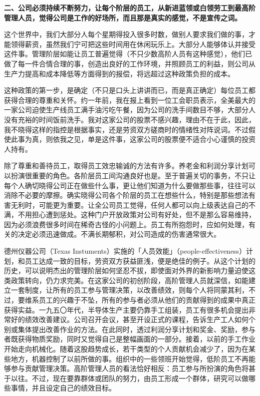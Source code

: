 \documentclass[UTF8,a4paper,zihao=-4,fontset = windows]{ctexart} %
\begin{document}
\textbf{二、公司必须持续不断努力，让每个阶层的员工，从新进蓝领或白领劳工到最高阶管理人员，觉得公司是工作的好场所，而且那是真实的感觉，不是宣传之词。}


这个世界中，我们大部分人每个星期得投入很多时数，做别人要求我们做的事，才能领得薪资，虽然我们宁可把这些时间用在休闲玩乐上。大部分人能够体认并接受这件事。管理阶层如能让员工普遍觉得（不只少数高阶人员有这种感觉），他们已做了每一件合情合理的事，创造出良好的工作环境，并照顾员工的利益，则公司从生产力提高和成本降低等方面得到的报偿，将远超过这种政策负担的成本。

这种政策的第一步，是确定（不只是口头上讲讲而已，而是真正确定）每位员工都获得合理的尊重和关怀。约一年前，我在报上看到一位工会职员表示，全美最大的一家公司迫使生产线员工满手油污吃午餐，因为公司的洗手间数目不够，大部分人没有充裕的时间饭前洗手。我对这家公司的股票不感兴趣，理由不在于此，因此，我不晓得这样的指控是根据事实，还是劳资双方磋商时的情绪性对阵说词。不过假使此事为真，则依我之见，单是这件事，这家公司的股票便不适合小心谨慎的投资人持有。

除了尊重和善待员工，取得员工效忠输诚的方法有许多。养老金和利润分享计划可以扮演很重要的角色。各阶层员工间沟通良好也是。至于普遍关切的事务，不只让每个人确切晓得公司正在做些什么事，更让他们知道为什么要做那些事，往往可以消除不必要的摩擦。确实晓得公司各个阶层的员工在想些什么，特别是那些想法有害无利时，可能更为重要。让全公司员工觉得，任何人都可以向上级表达自己的不满，不用担心遭到惩处。这种门户开放政策对公司有好处，但不是那么容易维持，因为必须浪费很多时间在稀奇古怪的小问题上。员工有所抱怨时，应如何处理，有关的决定必须迅速做成。不满长期郁积，对公司造成的伤害通常很大。

德州仪器公司（Texas Instuments）实施的「人员效能」（people-effectiveness）计划，和员工达成一致的目标，劳资双方获益匪浅，便是绝佳的例子。从这个计划的历史，可以说明杰出的管理阶层如何坚忍不拔，即使面对外界的新影响力量迫使这类政策转向，仍力求完美。在这家公司的初创阶段，高阶管理人员就深信，如能建立一套制度，让所有的员工参与管理决策，以改善绩效，则每个人将同蒙其利，不过，要维系员工的兴趣于不坠，所有的参与者必须从他们的贡献得到的成果中真正获得实益。一九五〇年代，半导体生产主要仍靠手工组装，员工有很多机会提出非常好的绩效改善建议。公司召开会议，甚至开设正式的课程，告诉生产工人如何个别或集体提出改善作业的方法。在此同时，透过利润分享计划和奖金、奖励，参与者既获得物质奖励，同时又觉得自己是整幅画面的一部分。接着，以前的手工作业开始走向机械化。随着这股趋势成长，若干类型的个人贡献机会减少了，因为在某些地方，机器控制了以前所做的事。组织中的一些领班开始觉得，低阶员工不再能够参与贡献管理决策。高阶管理人员的看法恰好相反：员工参与所扮演的角色将甚于以往。不过，现在要靠群体或团队的努力，由员工形成一个群体，研究可以做哪些事情，并且设定自己的绩效目标。
\end{document}

